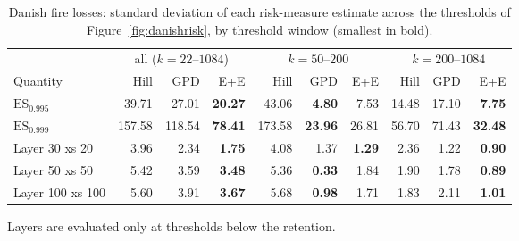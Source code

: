 \begin{table}[t]
\centering
\footnotesize
\setlength{\tabcolsep}{4pt}
\caption{Danish fire losses: standard deviation of each risk-measure estimate across the thresholds of Figure~\ref{fig:danishrisk}, by threshold window (smallest in bold).}
\label{tab:danishrisksd}
\begin{tabular}{lrrrrrrrrr}
\toprule
 & \multicolumn{3}{c}{all ($k=22$--$1084$)} & \multicolumn{3}{c}{$k=50$--$200$} & \multicolumn{3}{c}{$k=200$--$1084$} \\
\cmidrule(lr){2-4} \cmidrule(lr){5-7} \cmidrule(lr){8-10}
Quantity & Hill & GPD & E+E & Hill & GPD & E+E & Hill & GPD & E+E \\
\midrule
$\mathrm{ES}_{0.995}$ & 39.71 & 27.01 & \textbf{20.27} & 43.06 & \textbf{4.80} & 7.53 & 14.48 & 17.10 & \textbf{7.75} \\
$\mathrm{ES}_{0.999}$ & 157.58 & 118.54 & \textbf{78.41} & 173.58 & \textbf{23.96} & 26.81 & 56.70 & 71.43 & \textbf{32.48} \\
Layer 30 xs 20 & 3.96 & 2.34 & \textbf{1.75} & 4.08 & 1.37 & \textbf{1.29} & 2.36 & 1.22 & \textbf{0.90} \\
Layer 50 xs 50 & 5.42 & 3.59 & \textbf{3.48} & 5.36 & \textbf{0.33} & 1.84 & 1.90 & 1.78 & \textbf{0.89} \\
Layer 100 xs 100 & 5.60 & 3.91 & \textbf{3.67} & 5.68 & \textbf{0.98} & 1.71 & 1.83 & 2.11 & \textbf{1.01} \\
\bottomrule
\end{tabular}
\par\smallskip
\parbox{\linewidth}{\footnotesize Layers are evaluated only at thresholds below the retention.}
\end{table}
